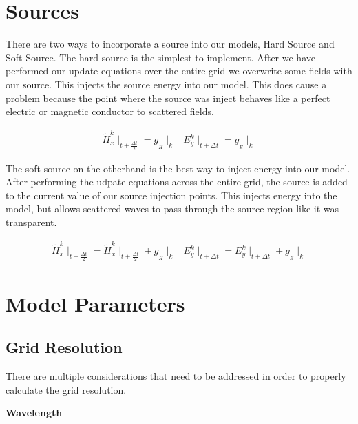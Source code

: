 \documentclass[a4paper,10pt]{article}
\begin{document}
\section{Sources}

There are two ways to incorporate a source into our models, Hard Source and Soft Source.  The hard source is the simplest to implement.  After we have performed our update equations over the entire grid we overwrite some fields with our source.  This injects the source energy into our model.  This does cause a problem because the point where the source was inject behaves like a perfect electric or magnetic conductor to scattered fields.

\begin{eqnarray*}
 \tilde{H}_x^k\mid_{t+\frac{\Delta t}{2}} = g_{_H}\mid_{k} & E_y^k\mid_{t+\Delta t} = g_{_E}\mid_{k}
\end{eqnarray*}

The soft source on the otherhand is the best way to inject energy into our model.  After performing the udpate equations across the entire grid, the source is added to the current value of our source injection points.  This injects energy into the model, but allows scattered waves to pass through the source region like it was transparent.

\begin{eqnarray*}
 \tilde{H}_x^k\mid_{t+\frac{\Delta t}{2}} = \tilde{H}_x^k\mid_{t+\frac{\Delta t}{2}} + g_{_H}\mid_{k} & E_y^k\mid_{t+\Delta t} = E_y^k\mid_{t+\Delta t} + g_{_E}\mid_{k}
\end{eqnarray*}

\section{Model Parameters}

\subsection{Grid Resolution}

There are multiple considerations that need to be addressed in order to properly calculate the grid resolution.  

\textbf{Wavelength}
\end{document}
